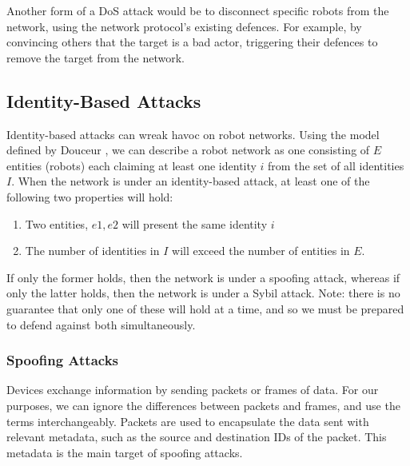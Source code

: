Another form of a DoS attack would be to disconnect specific robots from the network, using the network protocol's existing defences. For example, by convincing others that the target is a bad actor, triggering their defences to remove the target from the network. %

\subsection{Identity-Based Attacks}

Identity-based attacks can wreak havoc on robot networks. Using the model defined by Douceur \cite{SybilAttack}, we can describe a robot network as one consisting of $E$ entities (robots) each claiming at least one identity $i$ from the set of all identities $I$. When the network is under an identity-based attack, at least one of the following two properties will hold: %
\begin{enumerate}
    \item Two entities, $e1, e2$ will present the same identity $i$
    \item The number of identities in $I$ will exceed the number of entities in $E$.
\end{enumerate}
If only the former holds, then the network is under a spoofing attack, whereas if only the latter holds, then the network is under a Sybil attack. Note: there is no guarantee that only one of these will hold at a time, and so we must be prepared to defend against both simultaneously.

\subsubsection{Spoofing Attacks}
Devices exchange information by sending packets or frames of data. For our purposes, we can ignore the differences between packets and frames, and use the terms interchangeably. Packets are used to encapsulate the data sent with relevant metadata, such as the source and destination IDs of the packet. This metadata is the main target of spoofing attacks.

